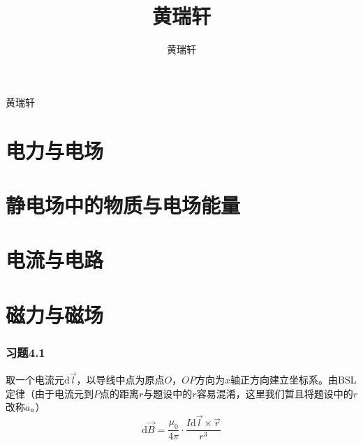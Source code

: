 \documentclass{SCIS2020cn}
\begin{document}
\DOI{}
\ReceiveDate{}
\ReviseDate{}
\AcceptDate{}
\OnlineDate{}

\title{黄瑞轩}{黄瑞轩}


\author[]{黄瑞轩}{}


\address[1]{ }



\AuthorCitation{ }
\enAuthorCitation{ }


\maketitle
\newpage

\part{电力与电场}
\part{静电场中的物质与电场能量}
\part{电流与电路}
\newpage
\part{磁力与磁场}
\section{习题4.1}
取一个电流元$\text{d}\overrightarrow{l}$，以导线中点为原点$O$，$OP$方向为$x$轴正方向建立坐标系。由BSL定律（由于电流元到$P$点的距离$r$与题设中的$r$容易混淆，这里我们暂且将题设中的$r$改称$a$。）
\begin{equation}
    \text{d}\overrightarrow{B}=\frac{\mu_0}{4\pi}·\frac{I\text{d}\overrightarrow{l}×\overrightarrow{r}}{r^3}
\end{equation}
\end{document}
